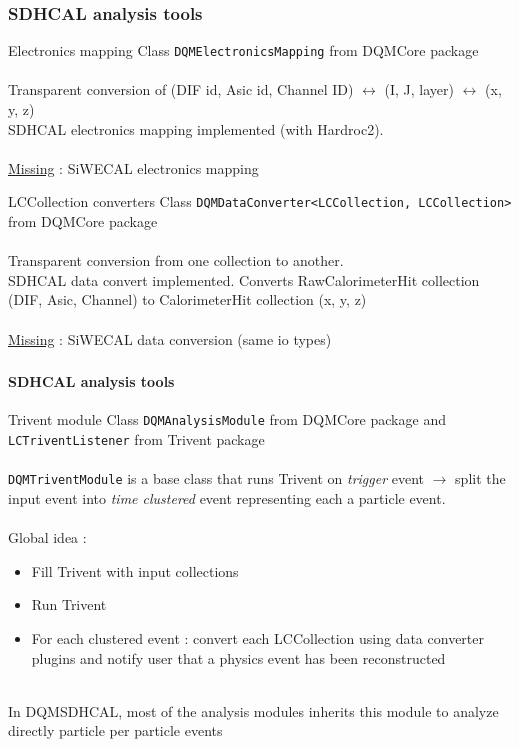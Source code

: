\documentclass[8pt]{beamer}
\begin{document}
    
  \begin{frame}[containsverbatim]
    \frametitle{\secname}
    \frametitle{SDHCAL analysis tools}
    \begin{block}{Electronics mapping}
      Class \verb|DQMElectronicsMapping| from DQMCore package \\~\\
      Transparent conversion of (DIF id, Asic id, Channel ID) $\leftrightarrow$ (I, J, layer) $\leftrightarrow$ (x, y, z) \\
      SDHCAL electronics mapping implemented (with Hardroc2). \\~\\
      \underline{Missing} : SiWECAL electronics mapping
    \end{block}
    \begin{block}{LCCollection converters}
      Class \verb|DQMDataConverter<LCCollection, LCCollection>| from DQMCore package \\~\\
      Transparent conversion from one collection to another. \\
      SDHCAL data convert implemented. Converts RawCalorimeterHit collection (DIF, Asic, Channel) to CalorimeterHit collection (x, y, z) \\~\\
      \underline{Missing} : SiWECAL data conversion (same io types) \\
    \end{block}
  \end{frame}
  
  
  \begin{frame}[containsverbatim]
    \frametitle{\secname}
    \framesubtitle{SDHCAL analysis tools}
    \begin{block}{Trivent module}
      Class \verb|DQMAnalysisModule| from DQMCore package and \verb|LCTriventListener| from Trivent package\\~\\
      \verb|DQMTriventModule| is a base class that runs Trivent on \textit{trigger} event $\rightarrow$ split the input event into \textit{time clustered} event representing each a particle event. \\~\\
      Global idea :
      \begin{itemize}
        \item Fill Trivent with input collections
        \item Run Trivent
        \item For each clustered event : convert each LCCollection using data converter plugins and notify user that a physics event has been reconstructed
      \end{itemize}
      ~ \\
      In DQMSDHCAL, most of the analysis modules inherits this module to analyze directly particle per particle events 
    \end{block}
  \end{frame}
  
\end{document}
